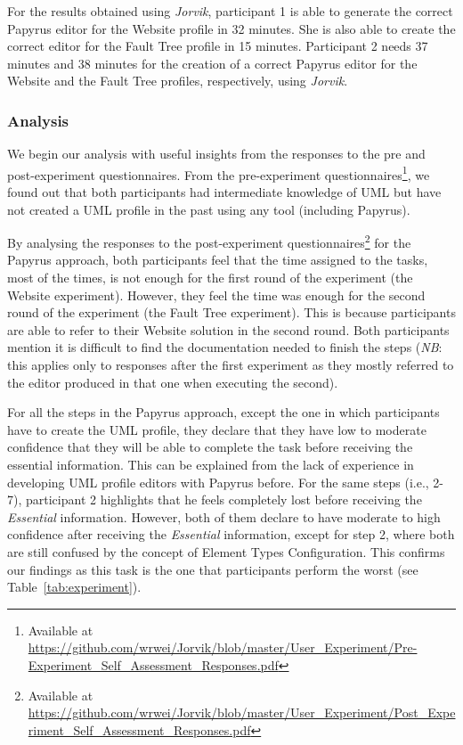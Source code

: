 For the results obtained using \textit{Jorvik}, participant 1 is able to generate the correct Papyrus editor for the Website profile in 32 minutes. She is also able to create the correct editor for the Fault Tree profile in 15 minutes.
Participant 2 needs 37 minutes and 38 minutes for the creation of a correct Papyrus editor for the Website and the Fault Tree profiles, respectively, using \textit{Jorvik}.


\subsubsection{Analysis} 
We begin our analysis with useful insights from the responses to the pre and post-experiment questionnaires.
From the pre-experiment questionnaires\footnote{Available at \url{https://github.com/wrwei/Jorvik/blob/master/User_Experiment/Pre-Experiment_Self_Assessment_Responses.pdf}}, we found out that both participants had intermediate knowledge of UML but have not created a UML profile in the past using any tool (including Papyrus).

By analysing the responses to the post-experiment questionnaires\footnote{Available at \url{https://github.com/wrwei/Jorvik/blob/master/User_Experiment/Post_Experiment_Self_Assessment_Responses.pdf}} for the Papyrus approach,
both participants feel that the time assigned to the tasks, most of the times, is not enough for the first round of the experiment (the Website experiment). 
However, they feel the time was enough for the second round of the experiment (the Fault Tree experiment). 
This is because participants are able to refer to their Website solution in the second round. 
Both participants mention it is difficult to find the documentation needed to finish the steps (\textit{NB}: this applies only to responses after the first experiment as they mostly referred to the editor produced in that one when executing the second).

For all the steps in the Papyrus approach, except the one in which participants have to create the UML profile, they declare that they have low to moderate confidence that they will be able to complete the task before receiving the essential information. 
This can be explained from the lack of experience in developing UML profile editors with Papyrus before. 
For the same steps (i.e., 2-7), participant 2 highlights that he feels completely lost before receiving the \textit{Essential} information. 
However, both of them declare to have moderate to high confidence after receiving the \textit{Essential} information, except for step 2, where both are still confused by the concept of Element Types Configuration. 
This confirms our findings as this task is the one that participants perform the worst (see Table~\ref{tab:experiment}). 
	
